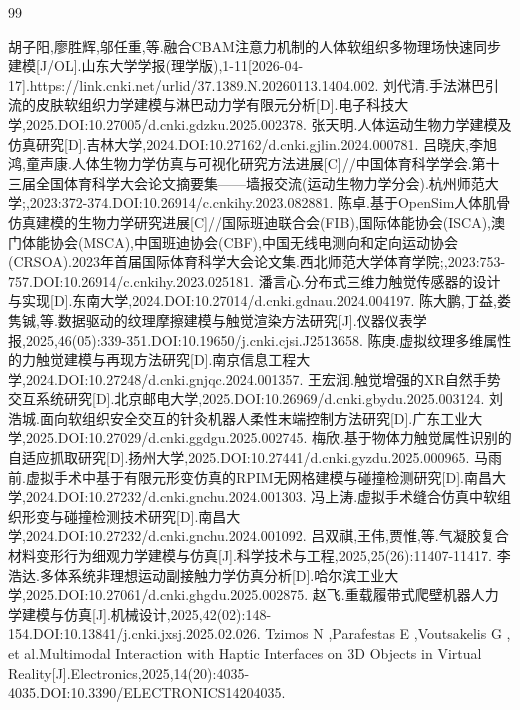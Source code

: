 
\cleardoublepage
\sloppy
\begin{thebibliography}{99}
\raggedright
\setlength{\itemsep}{0pt}
 胡子阳,廖胜辉,邬任重,等.融合CBAM注意力机制的人体软组织多物理场快速同步建模[J/OL].山东大学学报(理学版),1-11[2026-04-17].https://link.cnki.net/urlid/37.1389.N.20260113.1404.002.
 刘代清.手法淋巴引流的皮肤软组织力学建模与淋巴动力学有限元分析[D].电子科技大学,2025.DOI:10.27005/d.cnki.gdzku.2025.002378.
 张天明.人体运动生物力学建模及仿真研究[D].吉林大学,2024.DOI:10.27162/d.cnki.gjlin.2024.000781.
 吕晓庆,李旭鸿,童声康.人体生物力学仿真与可视化研究方法进展[C]//中国体育科学学会.第十三届全国体育科学大会论文摘要集——墙报交流(运动生物力学分会).杭州师范大学;,2023:372-374.DOI:10.26914/c.cnkihy.2023.082881.
 陈卓.基于OpenSim人体肌骨仿真建模的生物力学研究进展[C]//国际班迪联合会(FIB),国际体能协会(ISCA),澳门体能协会(MSCA),中国班迪协会(CBF),中国无线电测向和定向运动协会(CRSOA).2023年首届国际体育科学大会论文集.西北师范大学体育学院;,2023:753-757.DOI:10.26914/c.cnkihy.2023.025181.
 潘言心.分布式三维力触觉传感器的设计与实现[D].东南大学,2024.DOI:10.27014/d.cnki.gdnau.2024.004197.
 陈大鹏,丁益,娄隽铖,等.数据驱动的纹理摩擦建模与触觉渲染方法研究[J].仪器仪表学报,2025,46(05):339-351.DOI:10.19650/j.cnki.cjsi.J2513658.
 陈庚.虚拟纹理多维属性的力触觉建模与再现方法研究[D].南京信息工程大学,2024.DOI:10.27248/d.cnki.gnjqc.2024.001357.
 王宏润.触觉增强的XR自然手势交互系统研究[D].北京邮电大学,2025.DOI:10.26969/d.cnki.gbydu.2025.003124.
 刘浩城.面向软组织安全交互的针灸机器人柔性末端控制方法研究[D].广东工业大学,2025.DOI:10.27029/d.cnki.ggdgu.2025.002745.
 梅欣.基于物体力触觉属性识别的自适应抓取研究[D].扬州大学,2025.DOI:10.27441/d.cnki.gyzdu.2025.000965.
 马雨前.虚拟手术中基于有限元形变仿真的RPIM无网格建模与碰撞检测研究[D].南昌大学,2024.DOI:10.27232/d.cnki.gnchu.2024.001303.
 冯上涛.虚拟手术缝合仿真中软组织形变与碰撞检测技术研究[D].南昌大学,2024.DOI:10.27232/d.cnki.gnchu.2024.001092.
 吕双祺,王伟,贾惟,等.气凝胶复合材料变形行为细观力学建模与仿真[J].科学技术与工程,2025,25(26):11407-11417.
 李浩达.多体系统非理想运动副接触力学仿真分析[D].哈尔滨工业大学,2025.DOI:10.27061/d.cnki.ghgdu.2025.002875.
 赵飞.重载履带式爬壁机器人力学建模与仿真[J].机械设计,2025,42(02):148-154.DOI:10.13841/j.cnki.jxsj.2025.02.026.
 Tzimos N ,Parafestas E ,Voutsakelis G , et al.Multimodal Interaction with Haptic Interfaces on 3D Objects in Virtual Reality[J].Electronics,2025,14(20):4035-4035.DOI:10.3390/ELECTRONICS14204035.

\end{thebibliography}

